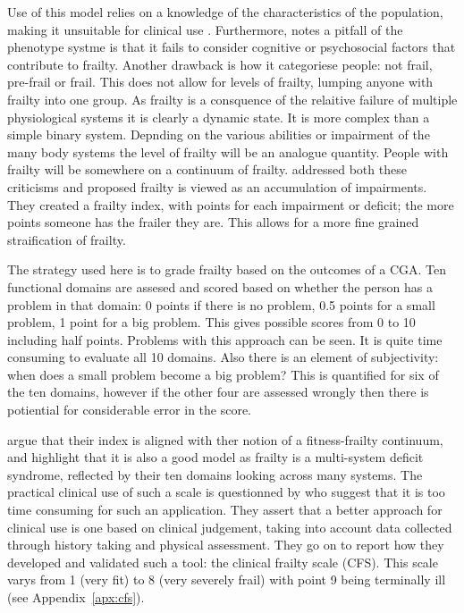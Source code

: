 \documentclass
[
	12pt,
	a4paper,
	oneside,
]{report}
\begin{document}
Use of this model relies on a knowledge of the characteristics of the population,
making it unsuitable for clinical use \parencite{ensrud:08}.
Furthermore, \textcite{martin:08} notes a pitfall of the phenotype systme is 
that it fails to
consider cognitive or psychosocial factors that contribute to frailty.
Another drawback is how it categoriese people: not frail,
pre-frail or frail. This does not allow for levels of frailty, lumping anyone with
frailty into one group. As frailty is a consquence of the relaitive failure of
multiple physiological systems it is clearly a dynamic state. It is more complex
than a simple binary system. Depnding on the various abilities or impairment of
the many body systems the level of frailty will be an analogue quantity. People
with frailty will be somewhere on a continuum of frailty. \textcite{jones:05} 
addressed both these criticisms and proposed frailty is viewed as an accumulation of
impairments. They created a frailty index, with points for each impairment or
deficit; the more points someone has the frailer they are. This allows for a more 
fine grained straification of frailty.

The strategy used here is to grade frailty based on the outcomes of a CGA. Ten
functional domains are assesed and scored based on whether the person has a
problem in that domain: 0 points if there is no problem, 0.5 points for a small
problem, 1 point for a big problem. This gives possible scores from 0 to 10 
including half points. Problems with this approach can be seen. It is quite
time consuming to evaluate all 10 domains. Also there is an element of 
subjectivity: when does a small problem become a big problem? This is quantified
for six of the ten domains, however if the other four are assessed
wrongly then there is potiential for considerable error in the score. 

\textcite{jones:05} argue that their index is aligned with ther notion of a 
fitness-frailty continuum, and highlight that it is also a good model as frailty
is a multi-system deficit syndrome, reflected by their ten domains looking
across many systems. The practical clinical use of such a scale is questionned
by \textcite{rockwood:05} who suggest that it is too time consuming for such an
application. They assert that a better approach for clinical use is one based
on clinical judgement, taking into account data collected through history taking
and physical assessment. They go on to report how they developed and validated
such a tool: the clinical frailty scale (CFS). This scale varys from 1 (very fit)
to 8 (very severely frail) with point 9 being terminally ill 
(see Appendix~\ref{apx:cfs}).
\end{document}
